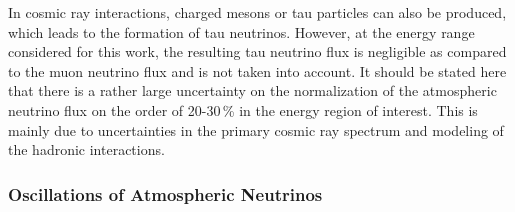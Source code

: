 In cosmic ray interactions, charged mesons or tau particles can also be produced, which leads to the formation of tau neutrinos.
However, at the energy range considered for this work, the resulting tau neutrino flux is negligible as compared to the muon neutrino flux  and is not taken into account.
It should be stated here that there is a rather large uncertainty on the normalization of the atmospheric neutrino flux on the order of 20-30\,\%  in the energy region of interest.
This is mainly due to uncertainties in the primary cosmic ray spectrum and modeling of the hadronic interactions.


\subsubsection{Oscillations of Atmospheric Neutrinos}

